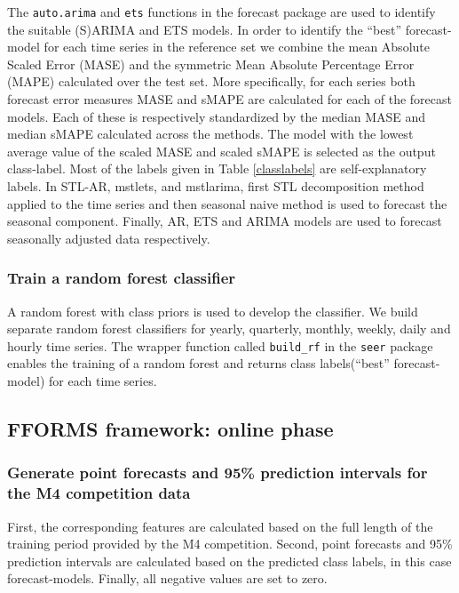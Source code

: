 \documentclass[11pt,a4paper,]{article}
\theoremstyle{definition}
\theoremstyle{definition}
\theoremstyle{definition}
\theoremstyle{remark}
\begin{document}
The \texttt{auto.arima} and \texttt{ets} functions in the forecast
package are used to identify the suitable (S)ARIMA and ETS models. In
order to identify the ``best'' forecast-model for each time series in
the reference set we combine the mean Absolute Scaled Error (MASE) and
the symmetric Mean Absolute Percentage Error (MAPE) calculated over the
test set. More specifically, for each series both forecast error
measures MASE and sMAPE are calculated for each of the forecast models.
Each of these is respectively standardized by the median MASE and median
sMAPE calculated across the methods. The model with the lowest average
value of the scaled MASE and scaled sMAPE is selected as the output
class-label. Most of the labels given in Table \ref{classlabels} are
self-explanatory labels. In STL-AR, mstlets, and mstlarima, first STL
decomposition method applied to the time series and then seasonal naive
method is used to forecast the seasonal component. Finally, AR, ETS and
ARIMA models are used to forecast seasonally adjusted data respectively.

\subsubsection{Train a random forest
classifier}\label{train-a-random-forest-classifier}

A random forest with class priors is used to develop the classifier. We
build separate random forest classifiers for yearly, quarterly, monthly,
weekly, daily and hourly time series. The wrapper function called
\texttt{build\_rf} in the \texttt{seer} package enables the training of
a random forest and returns class labels(``best'' forecast-model) for
each time series.

\subsection{FFORMS framework: online
phase}\label{fforms-framework-online-phase}

\subsubsection{Generate point forecasts and 95\% prediction intervals
for the M4 competition
data}\label{generate-point-forecasts-and-95-prediction-intervals-for-the-m4-competition-data}

First, the corresponding features are calculated based on the full
length of the training period provided by the M4 competition. Second,
point forecasts and 95\% prediction intervals are calculated based on
the predicted class labels, in this case forecast-models. Finally, all
negative values are set to zero.
\end{document}
